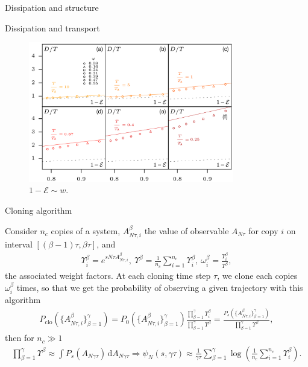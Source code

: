 \documentclass{beamer}
\begin{document}
{\begin{frame}[noframenumbering]{Dissipation and structure}
\end{frame}

\begin{frame}[noframenumbering]{Dissipation and transport}

\begin{figure}
\centering
\includegraphics[width=0.8\textwidth]{Fodor_2020_fig4.png}
\caption{$1 - \mathcal{E} \sim w$. }
\end{figure}

\end{frame}

\begin{frame}[noframenumbering]{Cloning algorithm}

Consider $n_c$ copies of a system, $A_{N\tau, i}^{\beta}$ the value of observable $A_{N\tau}$ for copy $i$ on interval $[(\beta-1)\tau, \beta\tau]$, and
\begin{align*}
\Upsilon_i^{\beta} = e^{s N \tau A_{N\tau, i}^{\beta}},~ \Upsilon^{\beta} = \frac{1}{n_c} \sum_{i=1}^{n_c} \Upsilon_i^{\beta},~ \omega_i^{\beta} = \frac{\Upsilon_i^{\beta}}{\Upsilon^{\beta}},
\end{align*}
the associated weight factors. At each cloning time step $\tau$, we clone each copies $\omega_i^{\beta}$ times, so that we get the probability of observing a given trajectory with this algorithm
\begin{align*}
P_{\text{clo}}(\{A_{N\tau, i}^{\beta}\}_{\beta=1}^{\gamma}) = P_0(\{A_{N\tau, i}^{\beta}\}_{\beta=1}^{\gamma}) \frac{\prod_{\beta=1}^{\gamma} \Upsilon_i^{\beta}}{\prod_{\beta=1}^{\gamma} \Upsilon^{\beta}} = \frac{P_s(\{A_{N\tau, i}^{\beta}\}_{\beta=1}^{\gamma})}{\prod_{\beta=1}^{\gamma} \Upsilon^{\beta}},
\end{align*}
then for $n_c \gg 1$
\begin{align*}
\prod_{\beta=1}^{\gamma} \Upsilon^{\beta} \approx \int P_s(A_{N\gamma\tau}) \, \text{d}A_{N\gamma\tau} \Rightarrow \psi_N(s, \gamma\tau) \approx \frac{1}{\gamma\tau} \sum_{\beta = 1}^{\gamma} \log \left(\frac{1}{n_c} \sum_{i=1}^{n_c} \Upsilon_i^{\beta}\right).
\end{align*}


\end{frame}}
\end{document}
